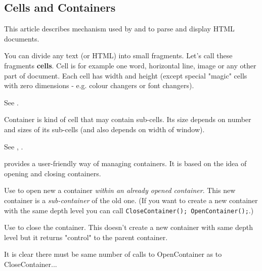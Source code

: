 \subsection{Cells and Containers}\label{cells}

This article describes mechanism used by 
 and 
 to parse and display HTML documents.


You can divide any text (or HTML) into small fragments. Let's call these
fragments {\bf cells}. Cell is for example one word, horizontal line, image
or any other part of document. Each cell has width and height (except special
"magic" cells with zero dimensions - e.g. colour changers or font changers).

See .


Container is kind of cell that may contain sub-cells. Its size depends
on number and sizes of its sub-cells (and also depends on width of window). 

See , 
.

\begin{comment}
This image shows you cells and containers:

\helponly{\image{}{contbox.bmp}}
\end{comment}

 provides a user-friendly way
of managing containers. It is based on the idea of opening and closing containers.

Use  to open new
a container {\it within an already opened container}. This new container is a 
{\it sub-container} of the old one. (If you want to create a new container with
the same depth level you can call {\tt CloseContainer(); OpenContainer();}.)

Use  to close the 
container. This doesn't create a new container with same depth level but
it returns "control" to the parent container.

\begin{comment}
See explanation:

\helponly{\image{}{cont.bmp}}
\end{comment}
It is clear there must be same number of calls to 
OpenContainer as to CloseContainer...


